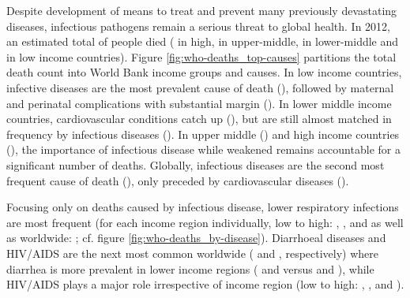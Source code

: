 Despite development of means to treat and prevent many previously devastating diseases, infectious pathogens remain a serious threat to global health. In 2012, an estimated total of \knitrTotalDeathsTwelve{} people died (\knitrPercentageDeathsTwelveHigh{} in high, \knitrPercentageDeathsTwelveUmid{} in upper-middle, \knitrPercentageDeathsTwelveLmid{} in lower-middle and \knitrPercentageDeathsTwelveLow{} in low income countries). Figure \ref{fig:who-deaths_top-causes} partitions the total death count into World Bank income groups and causes. In low income countries, infective diseases are the most prevalent cause of death (\knitrPercentDeathsTwelveLowInfect{}), followed by maternal and perinatal complications with substantial margin (\knitrPercentDeathsTwelveLowPerinat{}). In lower middle income countries, cardiovascular conditions catch up (\knitrPercentDeathsTwelveLmidCardio{}), but are still almost matched in frequency by infectious diseases (\knitrPercentDeathsTwelveLmidInfect{}). In upper middle (\knitrPercentDeathsTwelveUmidInfect{}) and high income countries (\knitrPercentDeathsTwelveHighInfect{}), the importance of infectious disease while weakened remains accountable for a significant number of deaths. Globally, infectious diseases are the second most frequent cause of death (\knitrPercentDeathsTwelveWorldInfect{}), only preceded by cardiovascular diseases (\knitrPercentDeathsTwelveWorldCardio{}).



Focusing only on deaths caused by infectious disease, lower respiratory infections are most frequent (for each income region individually, low to high: \knitrPercentageInfectTwelveLowLRI{}, \knitrPercentageInfectTwelveLmidLRI{}, \knitrPercentageInfectTwelveUmidLRI{} and \knitrPercentageInfectTwelveHighLRI{} as well as worldwide: \knitrPercentageInfectTwelveWorldLRI{}; cf. figure \ref{fig:who-deaths_by-disease}). Diarrhoeal diseases and HIV/AIDS are the next most common worldwide (\knitrPercentageInfectTwelveWorldDiarr{} and \knitrPercentageInfectTwelveWorldAIDS{}, respectively) where diarrhea is more prevalent in lower income regions (\knitrPercentageInfectTwelveLowDiarr{} and \knitrPercentageInfectTwelveLmidDiarr{} versus \knitrPercentageInfectTwelveUmidDiarr{} and \knitrPercentageInfectTwelveHighDiarr{}), while HIV/AIDS plays a major role irrespective of income region (low to high: \knitrPercentageInfectTwelveLowAIDS{}, \knitrPercentageInfectTwelveLmidAIDS{}, \knitrPercentageInfectTwelveUmidAIDS{} and \knitrPercentageInfectTwelveHighAIDS{}).

